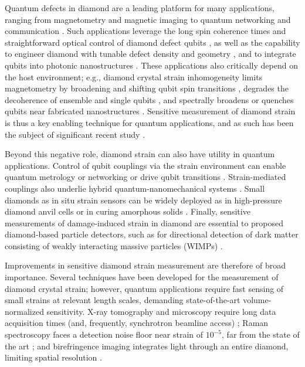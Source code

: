 \documentclass[reprint,superscriptaddress,hyphens,amsmath,amssymb,aps,prx,float]{revtex4-2}
\begin{document}
Quantum  defects in diamond are a leading platform for many applications, ranging from magnetometry and magnetic imaging \cite{QDMreview,SingleNVMagSensing2008,NVimaging2008,NVMagnetometer2008,RondinMagnetometry2014,NVNanoReview2014,SensitivityReport,ArunkumarSABRE2021} to quantum networking and communication \cite{PompiliQuantumNetwork2021,BhaskarQuantumCommunication2020}.  Such applications leverage the long spin coherence times and straightforward optical control of diamond defect qubits \cite{BalasubramanianCoherenceTime2009,DohertyPhysicsReports2013}, as well as the capability to engineer diamond with tunable defect density and geometry \cite{SensitivityReport,PurpleDiamond}, and to integrate qubits into photonic nanostructures \cite{NanophotonicPlatform2016,NguyenLukinNanophotonicRegister2019}.  These applications also critically depend on the host environment; e.g., diamond crystal strain inhomogeneity limits magnetometry by broadening and shifting qubit spin transitions \cite{StrainPaper}, degrades the decoherence of ensemble and single qubits \cite{SensitivityReport,vanDamEnglundImplantedNVCoherence2019,SiVStrain2018}, and spectrally broadens or quenches qubits near fabricated nanostructures \cite{KnauerFabStrain2020}.  Sensitive measurement of diamond strain is thus a key enabling technique for quantum applications, and as such has been the subject of significant recent study \cite{StrainPaper, AusStrain2019, EnglundStrain2016}.

Beyond this negative role, diamond strain can also have utility in quantum applications.  Control of qubit couplings via the strain environment can enable quantum metrology or networking \cite{SiVStrain2018,BennettLukinPhononSqueezing2013,XuQuantumInfoStrain2019,GolterOptomechanic2016} or drive qubit transitions \cite{MacQuarrieMechanicalControl2013,ChenAcousticDriving2020}.   Strain-mediated couplings also underlie hybrid quantum-nanomechanical systems \cite{BarsonNanomechanicalSensing2017,BarfussHybridSystems2019}.  Small diamonds as in situ strain sensors can be widely deployed as in high-pressure diamond anvil cells or in curing amorphous solids \cite{HoAnvilCells2020,HoAmorphousSolids2021}.  Finally, sensitive measurements of damage-induced strain in diamond are essential to proposed diamond-based particle detectors, such as for directional detection of dark matter consisting of weakly interacting massive particles (WIMPs) \cite{proposal,MarshallQST2021}.

Improvements in sensitive diamond strain measurement are therefore of broad importance.  Several techniques have been developed for the measurement of diamond crystal strain; however, quantum applications require fast sensing of small strains at relevant length scales, demanding state-of-the-art volume-normalized sensitivity.  X-ray tomography and microscopy require long data acquisition times (and, frequently, synchrotron beamline access) \cite{Friel2009,MooreXray2009,ourXray};  Raman spectroscopy faces a detection noise floor near strain of $10^{-5}$, far from the state of the art \cite{RamanStrain2011,AlexandermicroRaman1994}; and birefringence imaging integrates light through an entire diamond, limiting spatial resolution \cite{HoaBirefringence2014,StrainPaper}.
\end{document}
